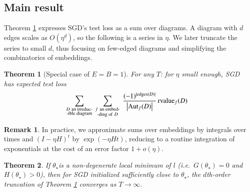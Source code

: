 \documentclass{article}
\theoremstyle{plain}
\newtheorem{thm}{Theorem}
\theoremstyle{definition}
\newtheorem{rmk}{Remark}
\newcommand{\wabs}[1]{\left|#1\right|}
\newcommand{\Aut}{\text{\textnormal{Aut}}}
\newcommand{\rvalue}{\text{\textnormal{rvalue}}}
\newcommand{\edges}{\text{\textnormal{edges}}}
\begin{document}
    \subsection{Main result}

        Theorem \ref{thm:resum} expresses SGD's test loss as a sum over
        diagrams.  A diagram with $d$ edges scales as $O(\eta^d)$, so the
        following is a series in $\eta$.  We later truncate the series to small
        $d$, thus focusing on few-edged diagrams and simplifying the
        combinatorics of embeddings.
        \begin{thm}[Special case of $E=B=1$] \label{thm:resum}
            For any $T$: for $\eta$ small enough, SGD has expected test loss
            \begin{equation*} \label{eq:resum}
                \sum_{\substack{D~\text{an irreduc-} \\ \text{-ible diagram}}}
                ~
                \sum_{\substack{f~\text{an embed-} \\ \text{-ding of}~D}}
                ~
                \frac{(-1)^{|\edges(D)|}}{\wabs{\Aut_f(D)}}
                \,
                {\rvalue_f}(D)
            \end{equation*}
        \end{thm}

 
        \begin{rmk} \label{rmk:integrate}
            In practice, we approximate sums over embeddings by integrals over
            times and $(I-\eta H)^t$ by $\exp(- \eta H t)$, reducing to a
            routine integration of exponentials at the cost of an error factor
            $1 + o(\eta)$.
        \end{rmk}

 
        \begin{thm} \label{thm:converge}
            If $\theta_\star$is a non-degenerate local minimum of $l$ (i.e.\
            $G(\theta_\star)=0$ and $H(\theta_\star) > 0$), then for SGD
            initialized sufficiently close to $\theta_\star$, the $d$th-order
            truncation of Theorem \ref{thm:resum} converges as $T\to \infty$.
        \end{thm}
\end{document}
